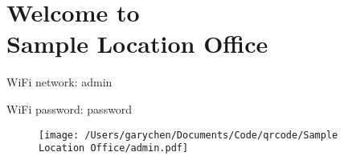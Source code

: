 \documentclass{article}
\begin{document}
\vspace*{\fill}

\centering

\section*{{\Huge Welcome to\\Sample Location Office}}

\vspace*{1cm}

{\Large WiFi network: admin}

\vspace*{1cm}

{\Large WiFi password: password}

\vspace*{1cm}

\begin{figure}[H]
  \centering
  \texttt{[image: /Users/garychen/Documents/Code/qrcode/Sample Location Office/admin.pdf]}
\end{figure}

\vspace*{\fill}
\end{document}
